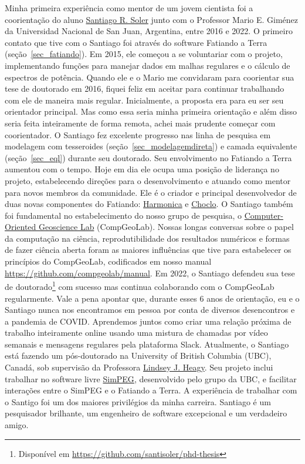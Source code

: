 \documentclass[10pt,a4paper,oneside]{book}
\begin{document}
Minha primeira experiência como mentor de um jovem cientista foi a coorientação
do aluno \href{https://www.santisoler.com/}{Santiago R. Soler} junto com o
Professor Mario E. Giménez da Universidad Nacional de San Juan, Argentina,
entre 2016 e 2022.
O primeiro contato que tive com o Santiago foi através do software
Fatiando a Terra (seção~\ref{sec_fatiando}).
Em 2015, ele começou a se voluntariar com o projeto, implementando funções
para manejar dados em malhas regulares e o cálculo de espectros de potência.
Quando ele e o Mario me convidaram para coorientar sua tese de doutorado em
2016, fiquei feliz em aceitar para continuar trabalhando com ele de maneira
mais regular.
Inicialmente, a proposta era para eu ser seu orientador principal.
Mas como essa seria minha primeira orientação e além disso seria feita
inteiramente de forma remota, achei mais prudente começar com coorientador.
O Santiago fez excelente progresso nas linha de pesquisa em modelagem com
tesseroides (seção~\ref{sec_modelagemdireta}) e camada equivalente
(seção~\ref{sec_eql}) durante seu doutorado.
Seu envolvimento no Fatiando a Terra aumentou com o tempo. Hoje em dia ele
ocupa uma posição de liderança no projeto, estabelecendo direções para o
desenvolvimento e atuando como mentor para novos membros da comunidade.
Ele é o criador e principal desenvolvedor de duas novas componentes do
Fatiando: \href{https://www.fatiando.org/harmonica}{Harmonica} e
\href{https://www.fatiando.org/choclo/}{Choclo}.
O Santiago também foi fundamental no estabelecimento do nosso grupo de pesquisa,
o \href{https://www.compgeolab.org/}{Computer-Oriented Geoscience Lab}
(CompGeoLab).
Nossas longas conversas sobre o papel da computação na ciência,
reprodutibilidade dos resultados numéricos e formas de fazer ciência aberta
foram as maiores influências que tive para estabelecer os princípios do
CompGeoLab, codificados em nosso manual
\url{https://github.com/compgeolab/manual}.
Em 2022, o Santiago defendeu sua tese de doutorado\footnote{Disponível em
\url{https://github.com/santisoler/phd-thesis}} com sucesso mas continua
colaborando com o CompGeoLab regularmente.
Vale a pena apontar que, durante esses 6 anos de orientação, eu e o Santiago
nunca nos encontramos em pessoa por conta de diversos desencontros e a pandemia
de COVID.
Aprendemos juntos como criar uma relação próxima de trabalho inteiramente
online usando uma mistura de chamadas por vídeo semanais e mensagens regulares
pela plataforma Slack.
Atualmente, o Santiago está fazendo um pós-doutorado na University of British
Columbia (UBC), Canadá, sob supervisão da Professora
\href{https://lindseyjh.ca/}{Lindsey J. Heagy}.
Seu projeto inclui trabalhar no software livre
\href{https://simpeg.xyz/}{SimPEG}, desenvolvido pelo grupo da UBC, e facilitar
interações entre o SimPEG e o Fatiando a Terra.
A experiência de trabalhar com o Santigo foi um dos maiores privilégios da
minha carreira.
Santiago é um pesquisador brilhante, um engenheiro de software excepcional
e um verdadeiro amigo.
\end{document}
